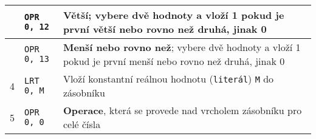 \documentclass[
12pt,
a4paper,
pdftex,
czech
]{report}
\begin{document}
\begin{table}[]
\begin{longtable}{|c|l|p{10cm}|}
\rule{0pt}{3ex} & \texttt{OPR 0, 12} & \textbf{Větší}; vybere dvě hodnoty a vloží 1 pokud je první větší nebo rovno než druhá, jinak 0 \\ \hline
\rule{0pt}{3ex} & \texttt{OPR 0, 13} & \textbf{Menší nebo rovno než}; vybere dvě hodnoty a vloží 1 pokud je první menší nebo rovno než druhá, jinak 0 \\ \hline
\rule{0pt}{3ex}4 & \texttt{LRT 0, M} & Vloží konstantní reálnou hodnotu (\texttt{literál}) \texttt{M} do zásobníku \\ \hline
\rule{0pt}{3ex}5 & \texttt{OPR 0, 0} & \textbf{Operace}, která se provede nad vrcholem zásobníku pro celé čísla \\ \hline
\end{longtable}
\end{table}
\end{document}
